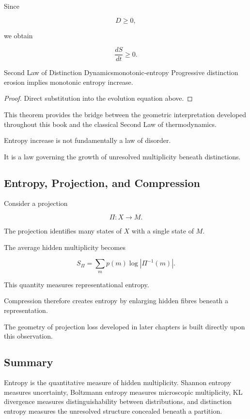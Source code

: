 \documentclass[12pt,twoside,openright]{book}
\begin{document}
Since

\[
D\ge0,
\]

we obtain

\[
\frac{dS}{dt}
\ge0.
\]

\begin{theorem}{Second Law of Distinction Dynamics}{monotonic-entropy}
Progressive distinction erosion implies monotonic entropy
increase.
\end{theorem}

\begin{proof}
Direct substitution into the evolution equation above.
\end{proof}

This theorem provides the bridge between the geometric
interpretation developed throughout this book and the
classical Second Law of thermodynamics.

Entropy increase is not fundamentally a law of disorder.

It is a law governing the growth of unresolved
multiplicity beneath distinctions.

\subsection{Entropy, Projection, and Compression}

Consider a projection

\[
\Pi:X\rightarrow M.
\]

The projection identifies many states of $X$ with a
single state of $M$.

The average hidden multiplicity becomes

\[
S_\Pi
=

\sum_m
p(m)
\log|\Pi^{-1}(m)|.
\]

This quantity measures representational entropy.

Compression therefore creates entropy by enlarging hidden
fibres beneath a representation.

The geometry of projection loss developed in later
chapters is built directly upon this observation.

\subsection{Summary}

Entropy is the quantitative measure of hidden
multiplicity. Shannon entropy measures uncertainty,
Boltzmann entropy measures microscopic multiplicity,
KL divergence measures distinguishability between
distributions, and distinction entropy measures the
unresolved structure concealed beneath a partition.
\end{document}
